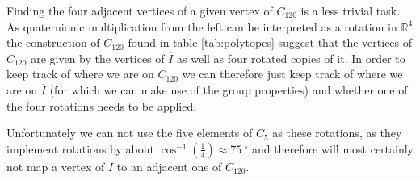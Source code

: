 Finding the four adjacent vertices of a given vertex of $C_{120}$ is a less trivial task. As quaternionic multiplication from the left can be interpreted as a rotation in $\mathbb{R}^4$ the construction of $C_{120}$ found in table \ref{tab:polytopes} suggest that the vertices of $C_{120}$ are given by the vertices of $\overline{I}$ as well as four rotated copies of it. In order to keep track of where we are on $C_{120}$ we can therefore just keep track of where we are on $\overline{I}$ (for which we can make use of the group properties) and whether one of the four rotations needs to be applied.

Unfortunately we can not use the five elements of $C_5$ as these rotations, as they implement rotations by about $\cos^{-1}\left({\frac{1}{4}}\right) \approx \SI{75}{^\circ}$ and therefore will most certainly not map a vertex of $\overline{I}$ to an adjacent one of $C_{120}$.

